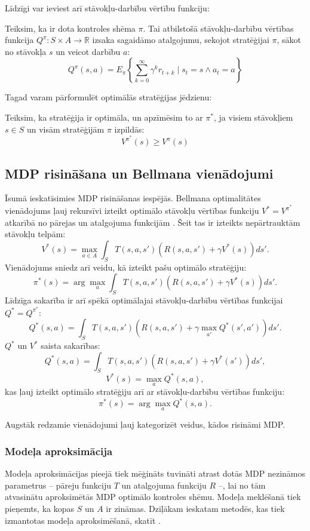\documentclass{ludis} %
\begin{document}
Līdzīgi var ieviest arī stāvokļu-darbību vērtību funkciju:
\begin{definicija}
Teiksim, ka ir dota kontroles shēma $\pi$.
Tai atbilstošā stāvokļu-darbību vērtības funkcija $Q^\pi : S \times A
\rightarrow \mathbb{R}$ izsaka sagaidāmo atalgojumu, sekojot stratēģijai $\pi$,
sākot no stāvokļa $s$ un veicot darbību $a$:
\[
	Q^\pi (s,a) = E_\pi \left\{ \sum_{k=0}^{\infty} \gamma^k r_{t+k} \mid s_t = s \land a_t = a\right\}
\]
\end{definicija}

Tagad varam pārformulēt optimālās stratēģijas jēdzienu:
\begin{definicija}
Teiksim, ka stratēģija ir optimāla, un apzīmēsim to ar $\pi^*$, ja visiem
stāvokļiem $s \in S$ un visām stratēģijām $\pi$ izpildās:
\[
	V^{\pi^*}(s) \geq V^{\pi}(s)
\]
\end{definicija}

\subsection{MDP risināšana un Bellmana vienādojumi}
Īsumā ieskatīsimies MDP risināšanas iespējās. Bellmana optimalitātes vienādojums
ļauj rekursīvi izteikt optimālo stāvokļu vērtības funkciju $V^* = V^{\pi^*}$
atkarībā no pārejas un atalgojuma funkcijām
\autocite{Bel}\autocite{Otterlo}\autocite{Hasselt2012}. Šeit tas ir izteikts
nepārtrauktām stāvokļu telpām: 
\[
	V^*(s) = \max_{a\in A} \int_S T(s,a,s')\left(R(s,a,s') + \gamma V^*(s)\right) ds'.
\]
Vienādojums sniedz arī veidu, kā izteikt pašu optimālo stratēģiju:
\begin{equation}
	\pi^*(s) =  \arg \max_{a} \int_S T(s,a,s')\left(R(s,a,s') + \gamma V^*(s)\right) ds'. \label{eq:1}
\end{equation}
Līdzīga sakarība ir arī spēkā optimālajai stāvokļu-darbību vērtības funkcijai $Q^* = Q^{\pi^*}$:
\[
	Q^*(s, a) = \int_S T(s,a,s')\left(R(s,a,s') + \gamma \max_{a'}Q^*(s',a')\right) ds'.
\]
$Q^*$ un $V^*$ saista sakarības:
\[
	Q^*(s, a) = \int_S T(s,a,s')\left(R(s,a,s') + \gamma V^*(s')\right) ds',
\]
\[
	V^*(s) = \max_{a} Q^*(s,a),
\]
kas ļauj izteikt optimālo stratēģiju arī ar stāvokļu-darbību vērtības funkciju:
\begin{equation}
	\pi^*(s) = \arg \max_a Q^*(s, a). \label{eq:2}
\end{equation}

Augstāk redzamie vienādojumi ļauj kategorizēt veidus, kādos risināmi MDP.

\subsubsection{Modeļa aproksimācija}\label{sec:model-based}
Modeļa aproksimācijas pieejā tiek mēģināts tuvināti atrast dotās MDP nezināmos
parametrus -- pāreju funkciju $T$ un atalgojuma funkciju $R$ --, lai no tām
atvasinātu aproksimētās MDP optimālo kontroles shēmu. Modeļa meklēšanā tiek
pieņemts, ka kopas $S$ un $A$ ir zināmas. Dziļākam ieskatam metodēs, kas tiek
izmantotas modeļa aproksimēšanā, skatīt \autocite{nguyen2011model}.
\end{document}

